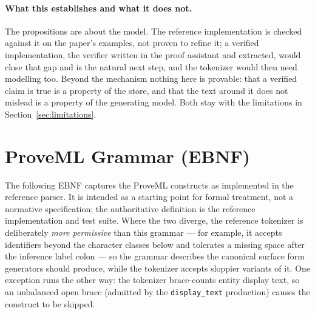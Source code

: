 \documentclass[11pt,a4paper]{article}
\begin{document}
\paragraph{What this establishes and what it does not.} The propositions are about the model. The reference implementation is checked against it on the paper's examples, not proven to refine it; a verified implementation, the verifier written in the proof assistant and extracted, would close that gap and is the natural next step, and the tokenizer would then need modelling too. Beyond the mechanism nothing here is provable: that a verified claim is true is a property of the store, and that the text around it does not mislead is a property of the generating model. Both stay with the limitations in Section~\ref{sec:limitations}.

\section{ProveML Grammar (EBNF)}
\label{app:grammar}

The following EBNF captures the ProveML constructs as implemented in the reference parser. It is intended as a starting point for formal treatment, not a normative specification; the authoritative definition is the reference implementation and test suite. Where the two diverge, the reference tokenizer is deliberately \textit{more permissive} than this grammar --- for example, it accepts identifiers beyond the character classes below and tolerates a missing space after the inference label colon --- so the grammar describes the canonical surface form generators should produce, while the tokenizer accepts sloppier variants of it. One exception runs the other way: the tokenizer brace-counts entity display text, so an unbalanced open brace (admitted by the \texttt{display\_text} production) causes the construct to be skipped.
\end{document}
